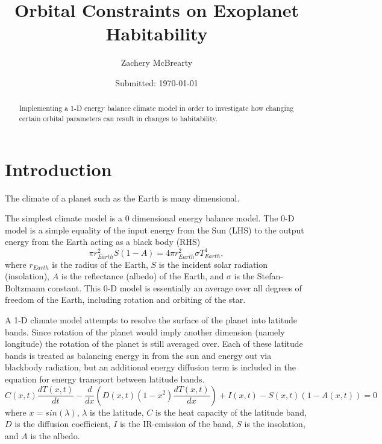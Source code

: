 \documentclass[12pt, onecolumn]{revtex4-2}    %
\begin{document}
\title{Orbital Constraints on Exoplanet Habitability}
\date{Submitted: \today{}}
\author{Zachery McBrearty}

\begin{abstract}

    Implementing a 1-D energy balance climate model in order to investigate how changing certain orbital parameters can result in changes to habitability.

\end{abstract}


\maketitle

\tableofcontents

\newpage

\section{Introduction}

The climate of a planet such as the Earth is many dimensional.

The simplest climate model is a 0 dimensional energy balance model.
The 0-D model is a simple equality of the input energy from the Sun (LHS) to the output energy from the Earth acting as a black body (RHS)
$$
    \pi r_{Earth}^2 S(1-A) = 4 \pi r_{Earth}^2 \sigma T_{Earth}^4,
$$
where $r_{Earth}$ is the radius of the Earth, $S$ is the incident solar radiation (insolation), $A$ is the reflectance (albedo) of the Earth, and $\sigma$ is the Stefan-Boltzmann constant.
This 0-D model is essentially an average over all degrees of freedom of the Earth, including rotation and orbiting of the star.

A 1-D climate model attempts to resolve the surface of the planet into latitude bands.
Since rotation of the planet would imply another dimension (namely longitude) the rotation of the planet is still averaged over.
Each of these latitude bands is treated as balancing energy in from the sun and energy out via blackbody radiation, but an additional energy diffusion term is included in the equation for energy transport between latitude bands.
$$
    C(x, t)\frac{dT(x, t)}{dt} - \frac{d}{dx} \left(D(x, t)(1-x^2)\frac{dT(x, t)}{dx}\right) + I(x, t) - S(x, t)(1-A(x, t)) = 0
$$
where $x=sin(\lambda)$, $\lambda$ is the latitude, $C$ is the heat capacity of the latitude band, $D$ is the diffusion coefficient, $I$ is the IR-emission of the band,
$S$ is the insolation, and $A$ is the albedo.
\end{document}
